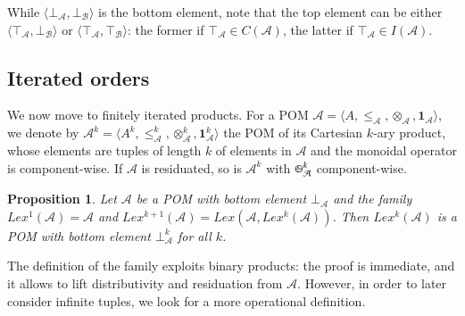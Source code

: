 \documentclass[a4paper]{elsarticle}
\newtheorem{proposition}{Proposition}
\newcommand{\monop}{\otimes}
\newcommand{\1}{\mathbf{1}}
\def\odiv{{ \ominus\hspace{-8pt}:}\;}
\begin{document}
While $\langle \bot_\mathcal{A}, \bot_\mathcal{B} \rangle$ is the bottom element, note that the top element can be 
either $\langle \top_\mathcal{A}, \bot_\mathcal{B} \rangle$ or $\langle \top_\mathcal{A}, \top_\mathcal{B} \rangle$:
the former if $\top_\mathcal{A} \in C(\mathcal{A})$, the latter if $\top_\mathcal{A} \in I(\mathcal{A})$.

\subsection{Iterated orders}

We now move to finitely iterated products. For a POM 
$\mathcal{A} = \langle A, \leq_\mathcal{A}, \monop_\mathcal{A}, \1_\mathcal{A} \rangle$, 
we denote by $\mathcal{A}^k =  \langle A^k, \leq^k_\mathcal{A}, \monop^k_\mathcal{A}, \1^k_\mathcal{A} \rangle$
the POM of its Cartesian $k$-ary product, whose elements are tuples of length $k$
of elements in $\mathcal{A}$ and the monoidal operator is component-wise.
%
If $\mathcal{A}$ is residuated, so is $\mathcal{A}^k$ with $\odiv^k_\mathcal{A}$ component-wise.

\begin{proposition}\label{def:lexilist}
	Let $\mathcal{A}$ be a POM with bottom element $\bot_\mathcal{A}$
	and the family 
	$Lex^1(\mathcal{A}) = \mathcal{A}$ and $Lex^{k+1}(\mathcal{A}) = Lex(\mathcal{A}, Lex^k(\mathcal{A}))$.
	Then $Lex^k(\mathcal{A})$ is a POM with bottom element $\bot^k_\mathcal{A}$ for all $k$.
\end{proposition}

The definition of the family exploits binary products: the proof is immediate,
and it allows to lift distributivity and residuation from $\mathcal{A}$.
However, in order to later consider infinite tuples, we look for 
a more operational definition. %
\end{document}
